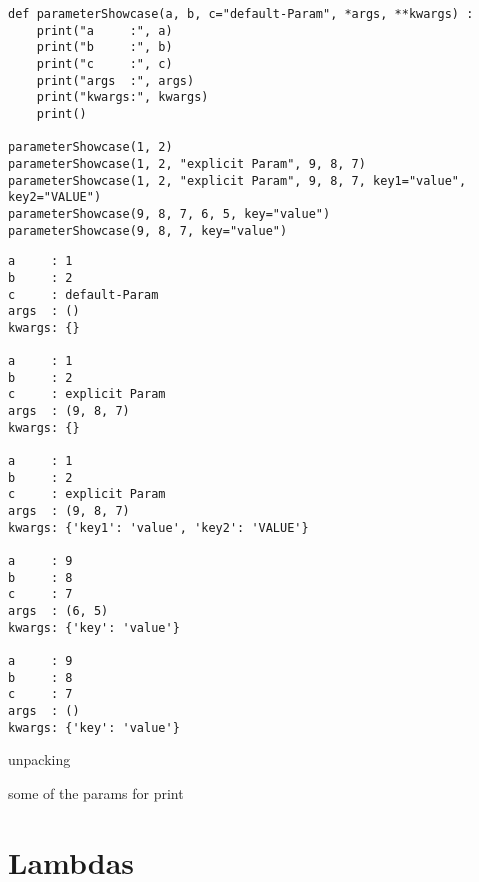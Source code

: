 \begin{codebox}
\begin{verbatim}
def parameterShowcase(a, b, c="default-Param", *args, **kwargs) :
    print("a     :", a)
    print("b     :", b)
    print("c     :", c)
    print("args  :", args)
    print("kwargs:", kwargs)
    print()

parameterShowcase(1, 2)
parameterShowcase(1, 2, "explicit Param", 9, 8, 7)
parameterShowcase(1, 2, "explicit Param", 9, 8, 7, key1="value", key2="VALUE")
parameterShowcase(9, 8, 7, 6, 5, key="value")
parameterShowcase(9, 8, 7, key="value")
\end{verbatim}
\end{codebox}
\begin{cmdbox}
\begin{verbatim}
a     : 1
b     : 2
c     : default-Param
args  : ()
kwargs: {}

a     : 1
b     : 2
c     : explicit Param
args  : (9, 8, 7)
kwargs: {}

a     : 1
b     : 2
c     : explicit Param
args  : (9, 8, 7)
kwargs: {'key1': 'value', 'key2': 'VALUE'}

a     : 9
b     : 8
c     : 7
args  : (6, 5)
kwargs: {'key': 'value'}

a     : 9
b     : 8
c     : 7
args  : ()
kwargs: {'key': 'value'}
\end{verbatim}
\end{cmdbox}

unpacking

some of the params for print

\section{Lambdas}
